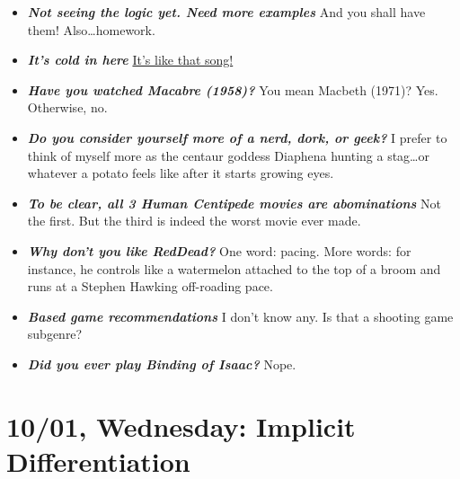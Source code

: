 \documentclass[11pt,letterpaper]{article}
\begin{document}
\begin{itemize}
\item {\bfseries\itshape Not seeing the logic yet. Need more examples} And you shall have them! Also\dots homework.

\item {\bfseries\itshape It's cold in here} \href{https://www.youtube.com/watch?v=xm3YgoEiEDc\&list=RDxm3YgoEiEDc}{It's like that song!}

\item {\bfseries\itshape Have you watched Macabre (1958)?} You mean Macbeth (1971)? Yes. Otherwise, no.

\item {\bfseries\itshape Do you consider yourself more of a nerd, dork, or geek?} I prefer to think of myself more as the centaur goddess Diaphena hunting a stag\dots or whatever a potato feels like after it starts growing eyes.

\item {\bfseries\itshape To be clear, all 3 Human Centipede movies are abominations} Not the first. But the third is indeed the worst movie ever made. 

\item {\bfseries\itshape Why don't you like RedDead?} One word: pacing. More words: for instance, he controls like a watermelon attached to the top of a broom and runs at a Stephen Hawking off-roading pace. 

\item {\bfseries\itshape Based game recommendations} I don't know any. Is that a shooting game subgenre? 

\item {\bfseries\itshape Did you ever play Binding of Isaac?} Nope.
\end{itemize}

\newpage
\section*{10/01, Wednesday: Implicit Differentiation\label{10-01}}
\end{document}
